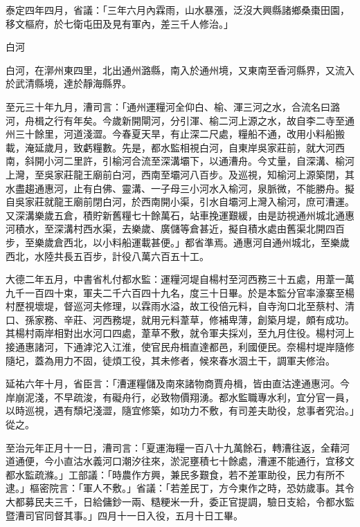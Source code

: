 \begin{pinyinscope}
 泰定四年四月，省議：「三年六月內霖雨，山水暴漲，泛沒大興縣諸鄉桑棗田園，移文樞府，於七衛屯田及見有軍內，差三千人修治。」



 白河



 白河，在漷州東四里，北出通州潞縣，南入於通州境，又東南至香河縣界，又流入於武清縣境，達於靜海縣界。



 至元三十年九月，漕司言：「通州運糧河全仰白、榆、渾三河之水，合流名曰潞河，舟楫之行有年矣。今歲新開閘河，分引渾、榆二河上源之水，故自李二寺至通州三十餘里，河道淺澀。今春夏天旱，有止深二尺處，糧船不通，改用小料船搬載，淹延歲月，致虧糧數。先是，都水監相視白河，自東岸吳家莊前，就大河西南，斜開小河二里許，引榆河合流至深溝壩下，以通漕舟。今丈量，自深溝、榆河上灣，至吳家莊龍王廟前白河，西南至壩河八百步。及巡視，知榆河上源築閉，其水盡趨通惠河，止有白佛、靈溝、一子母三小河水入榆河，泉脈微，不能勝舟。擬自吳家莊就龍王廟前閉白河，於西南開小渠，引水自壩河上灣入榆河，庶可漕運。又深溝樂歲五倉，積貯新舊糧七十餘萬石，站車挽運艱緩，由是訪視通州城北通惠河積水，至深溝村西水渠，去樂歲、廣儲等倉甚近，擬自積水處由舊渠北開四百步，至樂歲倉西北，以小料船運載甚便。」都省準焉。通惠河自通州城北，至樂歲西北，水陸共長五百步，計役八萬六百五十工。



 大德二年五月，中書省札付都水監：運糧河堤自楊村至河西務三十五處，用葦一萬九千一百四十束，軍夫二千六百四十九名，度三十日畢。於是本監分官率濠寨至楊村歷視壞堤，督巡河夫修理，以霖雨水溢，故工役倍元料，自寺洵口北至蔡村、清口、孫家務、辛莊、河西務堤，就用元料葦草，修補卑薄，創築月堤，頗有成功。其楊村兩岸相對出水河口四處，葦草不敷，就令軍夫採刈，至九月住役。楊村河上接通惠諸河，下通滹沱入江淮，使官民舟楫直達都邑，利國便民。奈楊村堤岸隨修隨圮，蓋為用力不固，徒煩工役，其未修者，候來春水涸土干，調軍夫修治。



 延祐六年十月，省臣言：「漕運糧儲及南來諸物商賈舟楫，皆由直沽達通惠河。今岸崩泥淺，不早疏浚，有礙舟行，必致物價翔湧。都水監職專水利，宜分官一員，以時巡視，遇有頹圮淺澀，隨宜修築，如功力不敷，有司差夫助役，怠事者究治。」從之。



 至治元年正月十一日，漕司言：「夏運海糧一百八十九萬餘石，轉漕往返，全藉河道通便，今小直沽水義河口潮汐往來，淤泥壅積七十餘處，漕運不能通行，宜移文都水監疏滌。」工部議：「時農作方興，兼民多艱食，若不差軍助役，民力有所不逮。」樞密院言：「軍人不敷。」省議：「若差民丁，方今東作之時，恐妨歲事。其令大都募民夫三千，日給傭鈔一兩、糙粳米一升，委正官提調，驗日支給，令都水監暨漕司官同督其事。」四月十一日入役，五月十日工畢。




\end{pinyinscope}
